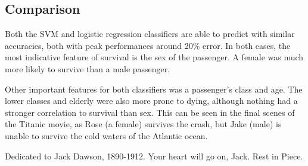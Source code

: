 \documentclass[10pt,twocolumn]{article}
\begin{document}
\subsection*{Comparison}

Both the SVM and logistic regression classifiers are able to predict with similar accuracies, both with peak performances around 20\% error. In both cases, the most indicative feature of survival is the sex of the passenger. A female was much more likely to survive than a male passenger. 

Other important features for both classifiers was a passenger's class and age. The lower classes and elderly were also more prone to dying, although nothing had a stronger correlation to survival than sex. This can be seen in the final scenes of the Titanic movie, as Rose (a female) survives the crash, but Jake (male) is unable to survive the cold waters of the Atlantic ocean. 

Dedicated to Jack Dawson, 1890-1912. Your heart will go on, Jack. Rest in Piece.
      
\end{document}
